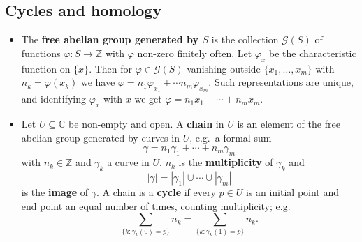 \documentclass{article}
\newenvironment{topic}[1]{%
{\subsection{#1}}%
\begin{itemize}%
}{%
\end{itemize}%
}
\newcommand{\term}[1]{{\bf #1}}
\newcommand{\remark}{\item}
\begin{document}
\begin{topic}{Cycles and homology}

\remark The \term{free abelian group generated by $S$} is the collection $\mathcal{G}(S)$ of functions $\varphi : S \to \mathbb{Z}$ with $\varphi$ non-zero finitely often. Let $\varphi_x$ be the characteristic function on $\{x\}$. Then for $\varphi \in \mathcal{G}(S)$ vanishing outside $\{x_1, \ldots, x_m\}$ with $n_k = \varphi(x_k)$ we have $\varphi = n_1 \varphi_{x_1} + \cdots n_m \varphi_{x_m}$. Such representations are unique, and identifying $\varphi_x$ with $x$ we get $\varphi = n_1 x_1 + \cdots + n_m x_m$.

\remark Let $U \subseteq \mathbb{C}$ be non-empty and open. A \term{chain} in $U$ is an element of the free abelian group generated by curves in $U$, e.g.\ a formal sum $$\gamma = n_1 \gamma_1 + \cdots + n_m \gamma_m$$ with $n_k \in \mathbb{Z}$ and $\gamma_k$ a curve in $U$. $n_k$ is the \term{multiplicity} of $\gamma_k$ and $$|\gamma| = |\gamma_1| \cup \cdots \cup |\gamma_m|$$ is the \term{image} of $\gamma$. A chain is a \term{cycle} if every $p \in U$ is an initial point and end point an equal number of times, counting multiplicity; e.g. $$\sum_{\{k:\gamma_k(0)=p\}} n_k = \sum_{\{k:\gamma_k(1)=p\}} n_k.$$

\end{topic}
\end{document}
